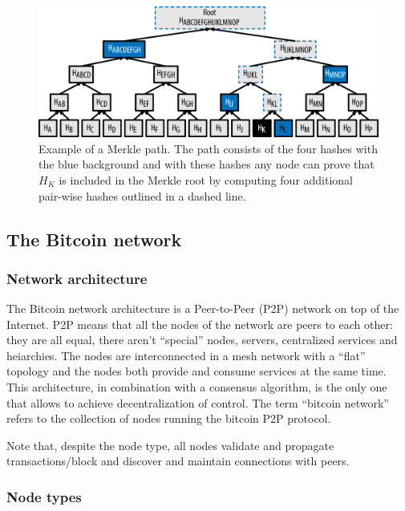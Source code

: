 \begin{figure}[!htb]
	\centering
	\includegraphics[width=1\linewidth]{img/merkle-tree-path.png}
	\caption{Example of a Merkle path. The path consists of the four hashes with the
  blue background and with these hashes any node can prove that $H_K$ is included
  in the Merkle root by computing four additional pair-wise hashes outlined in a
  dashed line.  }
	\label{fig:Merkle-tree-path}
\end{figure}








\subsection{The Bitcoin network}

\subsubsection{Network architecture} The Bitcoin network architecture is a
Peer-to-Peer (P2P) network on top of the Internet. P2P means that all the nodes
of the network are peers to each other: they are all equal, there aren't
``special'' nodes, servers, centralized services and heiarchies. The nodes are
interconnected in a mesh network with a ``flat'' topology and the nodes both
provide and consume services at the same time. This architecture, in combination
with a consensus algorithm, is the only one that allows to achieve
decentralization of control. The term ``bitcoin network'' refers to the
collection of nodes running the bitcoin P2P protocol.

Note that, despite the node type, all nodes validate and propagate
transactions/block and discover and maintain connections with peers.

\subsubsection{Node types}

